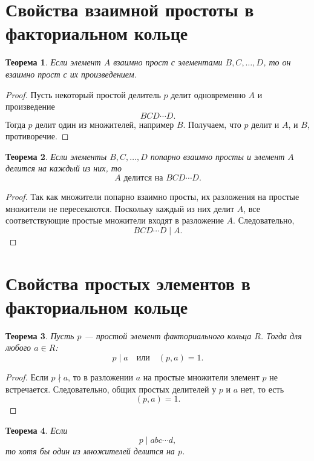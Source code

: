 \documentclass[12pt, a4paper]{article}
\newtheorem{theorem}{Теорема}
\theoremstyle{definition}
\theoremstyle{remark}
\begin{document}
\section{Свойства взаимной простоты в факториальном кольце}

\begin{theorem}
	Если элемент $A$ взаимно прост с элементами $B,C,\dots,D$, то он взаимно прост с их произведением.
\end{theorem}

\begin{proof}
	Пусть некоторый простой делитель $p$ делит одновременно $A$ и произведение
	\[
	BCD\cdots D.
	\]
	Тогда $p$ делит один из множителей, например $B$. Получаем, что $p$ делит и $A$, и $B$, противоречие.
\end{proof}

\begin{theorem}
	Если элементы $B,C,\dots,D$ попарно взаимно просты и элемент $A$ делится на каждый из них, то
	\[
	A \text{ делится на } BCD\cdots D.
	\]
\end{theorem}

\begin{proof}
	Так как множители попарно взаимно просты, их разложения на простые множители не пересекаются. Поскольку каждый из них делит $A$, все соответствующие простые множители входят в разложение $A$. Следовательно,
	\[
	BCD\cdots D\mid A.
	\]
\end{proof}

\section{Свойства простых элементов в факториальном кольце}

\begin{theorem}
	Пусть $p$ --- простой элемент факториального кольца $R$. Тогда для любого $a\in R$:
	\[
	p\mid a \quad \text{или}\quad (p,a)=1.
	\]
\end{theorem}

\begin{proof}
	Если $p\nmid a$, то в разложении $a$ на простые множители элемент $p$ не встречается. Следовательно, общих простых делителей у $p$ и $a$ нет, то есть
	\[
	(p,a)=1.
	\]
\end{proof}

\begin{theorem}
	Если
	\[
	p\mid abc\cdots d,
	\]
	то хотя бы один из множителей делится на $p$.
\end{theorem}
\end{document}
